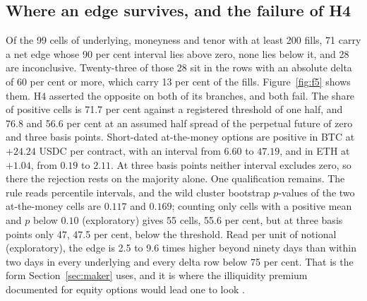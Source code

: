 \documentclass[a4paper,fleqn]{cas-dc}
\begin{document}
\subsection{Where an edge survives, and the failure of H4}
Of the 99 cells of underlying, moneyness and tenor with at least 200 fills, 71 carry a net edge whose 90 per cent
interval lies above zero, none lies below it, and 28 are inconclusive. Twenty-three of those 28 sit in the rows
with an absolute delta of 60 per cent or more, which carry 13 per cent of the fills. Figure~\ref{fig:f5}
shows them. H4 asserted the opposite on both of its branches, and both fail. The share of positive cells is
71.7 per cent against a registered threshold of one half, and 76.8 and 56.6 per cent at an assumed half spread of the
perpetual future of zero and three basis points. Short-dated at-the-money options are positive in BTC at $+24.24$ USDC per contract, with an interval from
$6.60$ to $47.19$, and in ETH at $+1.04$, from $0.19$ to $2.11$. At three basis points neither interval
excludes zero, so there the rejection rests on the majority alone. One qualification remains. The rule reads percentile intervals, and the
wild cluster bootstrap $p$-values of the two at-the-money cells are $0.117$ and $0.169$; counting only cells
with a positive mean and $p$ below $0.10$ (exploratory) gives 55 cells, 55.6 per cent, but at three basis points only 47,
47.5 per cent, below the threshold. Read per unit of notional (exploratory), the edge is 2.5 to 9.6 times higher
beyond ninety days than within two days in every underlying and every delta row below 75 per cent. That is the form
Section~\ref{sec:maker} uses, and it is where the illiquidity premium documented for equity options would
lead one to look \citep{christoffersen2018}.
\end{document}
